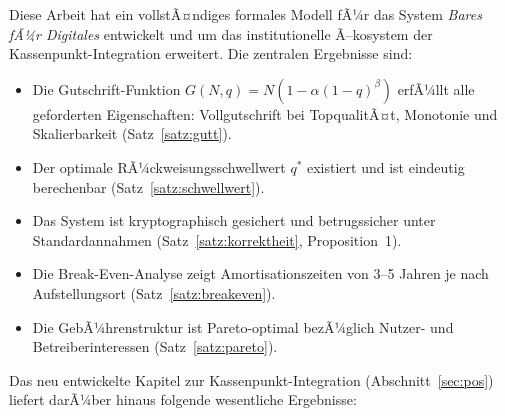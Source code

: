 ﻿\documentclass[a4paper,12pt]{article}
\theoremstyle{definition}
\begin{document}
Diese Arbeit hat ein vollstÃ¤ndiges formales Modell fÃ¼r das System
\emph{Bares fÃ¼r Digitales} entwickelt und um das institutionelle Ã–kosystem
der Kassenpunkt-Integration erweitert.  Die zentralen Ergebnisse sind:

\begin{itemize}
  \item Die Gutschrift-Funktion $G(N,q) = N(1-\alpha(1-q)^{\beta})$ erfÃ¼llt
        alle geforderten Eigenschaften: Vollgutschrift bei TopqualitÃ¤t,
        Monotonie und Skalierbarkeit (Satz~\ref{satz:gutt}).
  \item Der optimale RÃ¼ckweisungsschwellwert $q^*$ existiert und ist eindeutig
        berechenbar (Satz~\ref{satz:schwellwert}).
  \item Das System ist kryptographisch gesichert und betrugssicher unter
        Standardannahmen (Satz~\ref{satz:korrektheit}, Proposition~1).
  \item Die Break-Even-Analyse zeigt Amortisationszeiten von 3--5 Jahren
        je nach Aufstellungsort (Satz~\ref{satz:breakeven}).
  \item Die GebÃ¼hrenstruktur ist Pareto-optimal bezÃ¼glich Nutzer- und
        Betreiberinteressen (Satz~\ref{satz:pareto}).
\end{itemize}

Das neu entwickelte Kapitel zur Kassenpunkt-Integration (Abschnitt~\ref{sec:pos})
liefert darÃ¼ber hinaus folgende wesentliche Ergebnisse:
\end{document}

